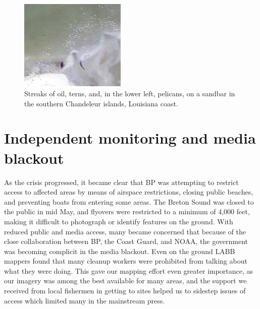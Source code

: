 \documentclass[11pt,oneside,notitlepage]{report}
\begin{document}
\begin{figure}
	\begin{flushright}
		\includegraphics[width=0.45\textwidth]{images/birds-chandeleur.png}
		\caption{Streaks of oil, terns, and, in the lower left, pelicans, on a sandbar in the southern Chandeleur islands, Louisiana coast.}
	\end{flushright}
\end{figure}

\section{Independent monitoring and media blackout}

As the crisis progressed, it became clear that BP was attempting to restrict access to affected areas by means of airspace restrictions, closing public beaches, and preventing boats from entering some areas. The Breton Sound was closed to the public in mid May, and flyovers were restricted to a minimum of 4,000 feet, making it difficult to photograph or identify features on the ground. \cite{peters2010efforts} With reduced public and media access, many became concerned that because of the close collaboration between BP, the Coast Guard, and NOAA, the government was becoming complicit in the media blackout. Even on the ground \ac{LABB} mappers found that many cleanup workers were prohibited from talking about what they were doing. \cite{dosemagen2010heywhat} This gave our mapping effort even greater importance, as our imagery was among the best available for many areas, and the support we received from local fishermen in getting to sites helped us to sidestep issues of access which limited many in the mainstream press.
\end{document}
